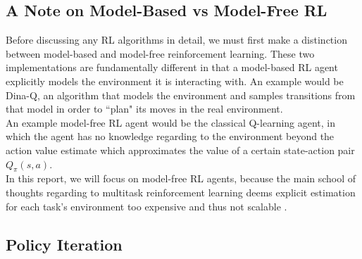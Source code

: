 \documentclass[12pt]{report}
\begin{document}
\subsection{A Note on Model-Based vs Model-Free RL}
Before discussing any RL algorithms in detail, we must first make a distinction between model-based and model-free reinforcement learning. These two implementations are fundamentally different in that a model-based RL agent explicitly models the environment it is interacting with. An example would be Dina-Q, an algorithm that models the environment and samples transitions from that model in order to ``plan" its moves in the real environment.\\

An example model-free RL agent would be the classical Q-learning agent, in which the agent has no knowledge regarding to the environment beyond the action value estimate which approximates the value of a certain state-action pair $Q_\pi(s,a)$.\\

In this report, we will focus on model-free RL agents, because the main school of thoughts regarding to multitask reinforcement learning deems explicit estimation for each task's environment too expensive and thus not scalable \cite{sharma2017online}.

\subsection{Policy Iteration} \label{sec:policy-iter}
\end{document}
